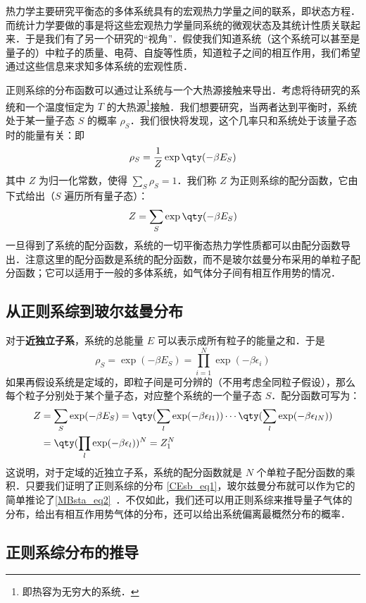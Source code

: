 
\begin{issues}
\issueDraft
\end{issues}

热力学主要研究平衡态的多体系统具有的宏观热力学量之间的联系，即状态方程．而统计力学要做的事是将这些宏观热力学量同系统的微观状态及其统计性质关联起来．于是我们有了另一个研究的“视角”．假使我们知道系统（这个系统可以甚至是量子的）中粒子的质量、电荷、自旋等性质，知道粒子之间的相互作用，我们希望通过这些信息来求知多体系统的宏观性质．

正则系综的分布函数可以通过让系统与一个大热源接触来导出．考虑将待研究的系统和一个温度恒定为 $T$ 的大热源\footnote{即热容为无穷大的系统．}接触．我们想要研究，当两者达到平衡时，系统处于某一量子态 $S$ 的概率 $\rho_S$．我们很快将发现，这个几率只和系统处于该量子态时的能量有关：即
\begin{equation}\label{CEsb_eq1}
\rho_S=\frac{1}{Z}\exp\qty(-\beta E_S)
\end{equation}
其中 $Z$ 为归一化常数，使得 $\sum_S \rho_S=1$．我们称 $Z$ 为正则系综的配分函数，它由下式给出（$S$ 遍历所有量子态）：
\begin{equation}
Z=\sum_S \exp\qty(-\beta E_S)
\end{equation}
一旦得到了系统的配分函数，系统的一切平衡态热力学性质都可以由配分函数导出．注意这里的配分函数是系统的配分函数，而不是玻尔兹曼分布采用的单粒子配分函数；它可以适用于一般的多体系统，如气体分子间有相互作用势的情况．
\subsection{从正则系综到玻尔兹曼分布}
对于\textbf{近独立子系}，系统的总能量 $E$ 可以表示成所有粒子的能量之和．于是
\begin{equation}
\rho_S=\exp(-\beta E_S)=\prod_{i=1}^N\exp(-\beta\epsilon_i)
\end{equation}
如果再假设系统是定域的，即粒子间是可分辨的（不用考虑全同粒子假设），那么每个粒子分别处于某个量子态，对应整个系统的一个量子态 $S$．配分函数可写为：
\begin{equation}
\begin{aligned}
Z&=\sum_S\exp(-\beta E_S)=\qty(\sum_{l}\exp(-\beta\epsilon_{l1}))\cdots\qty(\sum_{l}\exp(-\beta\epsilon_{lN}))\\
&=\qty(\prod_{l}\exp(-\beta\epsilon_{l}))^N=Z_1^N
\end{aligned}
\end{equation}
这说明，对于定域的近独立子系，系统的配分函数就是 $N$ 个单粒子配分函数的乘积．只要我们证明了正则系综的分布 \autoref{CEsb_eq1}，玻尔兹曼分布就可以作为它的简单推论了\autoref{MBsta_eq2}~．不仅如此，我们还可以用正则系综来推导量子气体的分布，给出有相互作用势气体的分布，还可以给出系统偏离最概然分布的概率．
\subsection{正则系综分布的推导}
